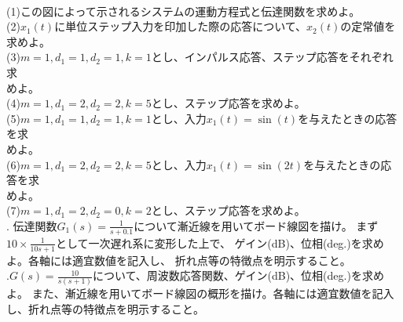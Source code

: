\documentclass[a4paper,12pt]{article}
\begin{document}
\begin{minipage}[t]{0.35\linewidth}
\begin{center}
    \end{center}
\end{minipage}\\

\indent
(1)この図によって示されるシステムの運動方程式と伝達関数を求めよ。\\

\indent
(2)\(x_1(t)\)に単位ステップ入力を印加した際の応答について、\(x_2(t)\)の定常値を求めよ。\\

\indent
(3)\(m=1,d_1=1,d_2=1,k=1\)とし、インパルス応答、ステップ応答をそれぞれ求\\
\indent \quad めよ。\\

\indent
(4)\(m=1,d_1=2,d_2=2,k=5\)とし、ステップ応答を求めよ。\\

\indent
(5)\(m=1,d_1=1,d_2=1,k=1\)とし、入力\(x_1(t)=\sin(t)\)を与えたときの応答を求\\
\indent \quad めよ。\\

\indent
(6)\(m=1,d_1=2,d_2=2,k=5\)とし、入力\(x_1(t)=\sin(2t)\)を与えたときの応答を求\\
\indent \quad めよ。\\

\indent
(7)\(m=1,d_1=2,d_2=0,k=2\)とし、ステップ応答を求めよ。\\

. 伝達関数\(G_1(s)=\frac{1}{s+0.1}\)について漸近線を用いてボード線図を描け。
まず\(10 \times \frac{1}{10s+1}\)として一次遅れ系に変形した上で、
ゲイン(dB)、位相(deg.)を求めよ。各軸には適宜数値を記入し、
折れ点等の特徴点を明示すること。\\


.\(G(s)=\frac{10}{s(s+1)}\)について、周波数応答関数、ゲイン(dB)、位相(deg.)を求めよ。
また、漸近線を用いてボード線図の概形を描け。各軸には適宜数値を記入し、折れ点等の特徴点を明示すること。
\end{document}
